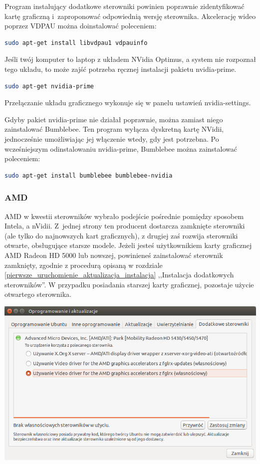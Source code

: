 Program instalujący dodatkowe sterowniki powinien poprawnie zidentyfikować kartę graficzną i~zaproponować odpowiednią wersję sterownika.
Akcelerację wideo poprzez VDPAU można doinstalować poleceniem:

\begin{lstlisting}[language=bash]
sudo apt-get install libvdpau1 vdpauinfo
\end{lstlisting}

Jeśli twój komputer to laptop z układem NVidia Optimus, a system nie rozpoznał tego układu, to może zajść potrzeba ręcznej instalacji pakietu nvidia-prime. 

\begin{lstlisting}[language=bash]
sudo apt-get nvidia-prime
\end{lstlisting}

\noindent Przełączanie układu graficznego wykonuje się w panelu ustawień \textcolor{ubuntu_orange}{nvidia-settings}.

Gdyby pakiet nvidia-prime nie działał poprawnie, można zamiast niego zainstalować Bumblebee. Ten program wyłącza dyskretną kartę NVidii, jednocześnie umożliwiając jej włączenie wtedy, gdy jest potrzebna.
Po wcześniejszym odinstalowaniu nvidia-prime, Bumblebee można zainstalować poleceniem:

\begin{lstlisting}[language=bash]
sudo apt-get install bumblebee bumblebee-nvidia
\end{lstlisting}

\subsubsection{AMD}
AMD w kwestii sterowników wybrało podejście pośrednie pomiędzy sposobem Intela, a nVidii. Z~jednej strony ten producent dostarcza zamknięte sterowniki (ale tylko do najnowszych kart graficznych), z drugiej zaś rozwija sterowniki otwarte, obsługujące starsze modele. Jeżeli jesteś użytkownikiem karty graficznej AMD Radeon HD 5000 lub nowszej, powinieneś zainstalować sterownik zamknięty, zgodnie z procedurą opisaną w rozdziale \ref{pierwsze_uruchomienie_aktualizacja_instalacja} ,,Instalacja dodatkowych sterowników''. W przypadku posiadania starszej karty graficznej, pozostaje użycie otwartego sterownika.

\begin{center}
	\includegraphics[width=\linewidth]{images/sterowniki_AMD.png}
\end{center}

